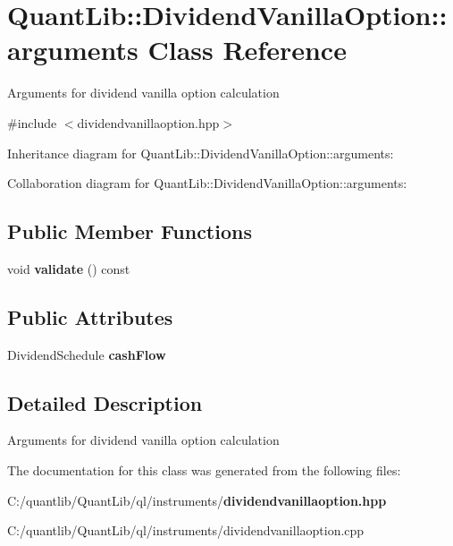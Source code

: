 \section{Quant\+Lib\+:\+:Dividend\+Vanilla\+Option\+:\+:arguments Class Reference}
\label{class_quant_lib_1_1_dividend_vanilla_option_1_1arguments}


Arguments for dividend vanilla option calculation  




{\ttfamily \#include $<$dividendvanillaoption.\+hpp$>$}



Inheritance diagram for Quant\+Lib\+:\+:Dividend\+Vanilla\+Option\+:\+:arguments\+:


Collaboration diagram for Quant\+Lib\+:\+:Dividend\+Vanilla\+Option\+:\+:arguments\+:
\subsection*{Public Member Functions}
\begin{DoxyCompactItemize}
\item 
void {\bfseries validate} () const \label{class_quant_lib_1_1_dividend_vanilla_option_1_1arguments_aa007be06bae148bc4feebf64349a358c}

\end{DoxyCompactItemize}
\subsection*{Public Attributes}
\begin{DoxyCompactItemize}
\item 
Dividend\+Schedule {\bfseries cash\+Flow}\label{class_quant_lib_1_1_dividend_vanilla_option_1_1arguments_a9201b15ede5f48a696bd9ea5efbd5eb8}

\end{DoxyCompactItemize}


\subsection{Detailed Description}
Arguments for dividend vanilla option calculation 

The documentation for this class was generated from the following files\+:\begin{DoxyCompactItemize}
\item 
C\+:/quantlib/\+Quant\+Lib/ql/instruments/{\bf dividendvanillaoption.\+hpp}\item 
C\+:/quantlib/\+Quant\+Lib/ql/instruments/dividendvanillaoption.\+cpp\end{DoxyCompactItemize}
